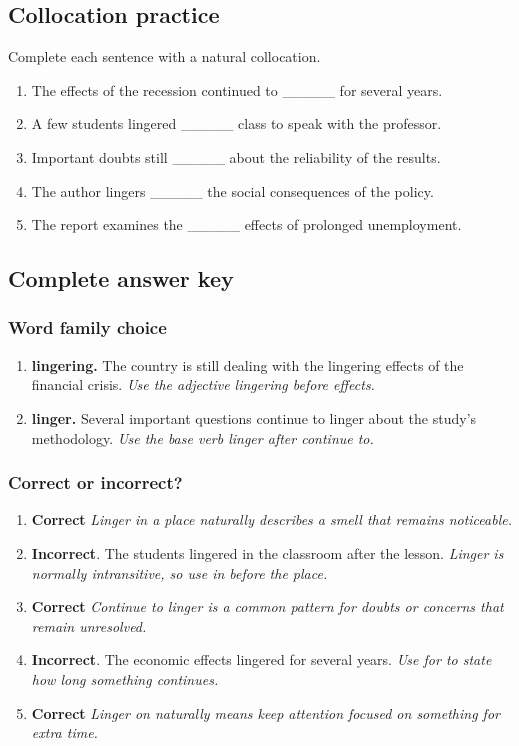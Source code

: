 \documentclass[11pt]{article}
\begin{document}
\subsection{Collocation practice}
Complete each sentence with a natural collocation.

\begin{enumerate}
  \item The effects of the recession continued to \_\_\_\_\_ for several years.
  \item A few students lingered \_\_\_\_\_ class to speak with the professor.
  \item Important doubts still \_\_\_\_\_ about the reliability of the results.
  \item The author lingers \_\_\_\_\_ the social consequences of the policy.
  \item The report examines the \_\_\_\_\_ effects of prolonged unemployment.
\end{enumerate}

\subsection{Complete answer key}
\subsubsection{Word family choice}
\begin{enumerate}
  \item \textbf{lingering.} The country is still dealing with the lingering effects of the financial crisis. \emph{Use the adjective lingering before effects.}
  \item \textbf{linger.} Several important questions continue to linger about the study's methodology. \emph{Use the base verb linger after continue to.}
\end{enumerate}

\subsubsection{Correct or incorrect?}
\begin{enumerate}
  \item \textbf{Correct} \emph{Linger in a place naturally describes a smell that remains noticeable.}
  \item \textbf{Incorrect}. The students lingered in the classroom after the lesson. \emph{Linger is normally intransitive, so use in before the place.}
  \item \textbf{Correct} \emph{Continue to linger is a common pattern for doubts or concerns that remain unresolved.}
  \item \textbf{Incorrect}. The economic effects lingered for several years. \emph{Use for to state how long something continues.}
  \item \textbf{Correct} \emph{Linger on naturally means keep attention focused on something for extra time.}
\end{enumerate}
\end{document}
